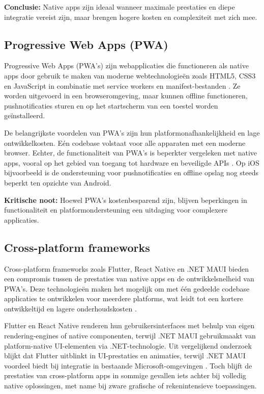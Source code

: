 \textbf{Conclusie:} Native apps zijn ideaal wanneer maximale prestaties en diepe integratie vereist zijn, maar brengen hogere kosten en complexiteit met zich mee.

\subsection{Progressive Web Apps (PWA)}
Progressive Web Apps (PWA’s) zijn webapplicaties die functioneren als native apps door gebruik te maken van moderne webtechnologieën zoals HTML5, CSS3 en JavaScript in combinatie met service workers en manifest-bestanden \autocite{Osmani2023}. Ze worden uitgevoerd in een browseromgeving, maar kunnen offline functioneren, pushnotificaties sturen en op het startscherm van een toestel worden geïnstalleerd.

De belangrijkste voordelen van PWA’s zijn hun platformonafhankelijkheid en lage ontwikkelkosten. Eén codebase volstaat voor alle apparaten met een moderne browser. Echter, de functionaliteit van PWA’s is beperkter vergeleken met native apps, vooral op het gebied van toegang tot hardware en beveiligde APIs \autocite{Malavolta2023}. Op iOS bijvoorbeeld is de ondersteuning voor pushnotificaties en offline opslag nog steeds beperkt ten opzichte van Android.

\textbf{Kritische noot:} Hoewel PWA’s kostenbesparend zijn, blijven beperkingen in functionaliteit en platformondersteuning een uitdaging voor complexere applicaties.

\subsection{Cross-platform frameworks}
Cross-platform frameworks zoals Flutter, React Native en .NET MAUI bieden een compromis tussen de prestaties van native apps en de ontwikkelsnelheid van PWA’s. Deze technologieën maken het mogelijk om met één gedeelde codebase applicaties te ontwikkelen voor meerdere platforms, wat leidt tot een kortere ontwikkeltijd en lagere onderhoudskosten \autocite{Kuppan2024}.

Flutter en React Native renderen hun gebruikersinterfaces met behulp van eigen rendering-engines of native componenten, terwijl .NET MAUI gebruikmaakt van platform-native UI-elementen via .NET-technologie. Uit vergelijkend onderzoek blijkt dat Flutter uitblinkt in UI-prestaties en animaties, terwijl .NET MAUI voordeel biedt bij integratie in bestaande Microsoft-omgevingen \autocite{Gajjam2025}. Toch blijft de prestaties van cross-platform apps in sommige gevallen iets achter bij volledig native oplossingen, met name bij zware grafische of rekenintensieve toepassingen.

